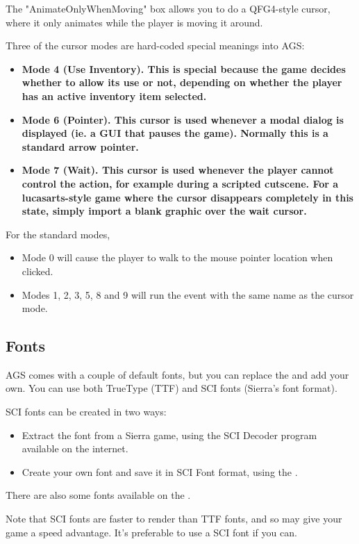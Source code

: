 The "AnimateOnlyWhenMoving" box allows you to do a QFG4-style cursor, where it only
animates while the player is moving it around.

Three of the cursor modes are hard-coded special meanings into AGS:
\begin{itemize}
\item \bf{Mode 4 (Use Inventory)}. This is special because the game decides whether to
allow its use or not, depending on whether the player has an active inventory item
selected.
\item \bf{Mode 6 (Pointer)}. This cursor is used whenever a modal dialog is displayed
(ie. a GUI that pauses the game). Normally this is a standard arrow pointer.
\item \bf{Mode 7 (Wait)}. This cursor is used whenever the player cannot control the
action, for example during a scripted cutscene. For a lucasarts-style game where the cursor
disappears completely in this state, simply import a blank graphic over the wait cursor.
\end{itemize}

For the standard modes,
\begin{itemize}
\item Mode 0 will cause the player to walk to the mouse pointer location when clicked.
\item Modes 1, 2, 3, 5, 8 and 9 will run the event with the same name as the cursor mode.
\end{itemize}


\subsection{Fonts}%

AGS comes with a couple of default fonts, but you can replace the and add your own.
You can use both TrueType (TTF) and SCI fonts (Sierra's font format).

SCI fonts can be created in two ways:
\begin{itemize}
\item Extract the font from a Sierra game, using the SCI Decoder program
available on the internet.
\item Create your own font and save it in SCI Font format, using the
.
\end{itemize}
There are also some fonts available on the
.

Note that SCI fonts are faster to render than TTF fonts, and so may give your game
a speed advantage. It's preferable to use a SCI font if you can.

